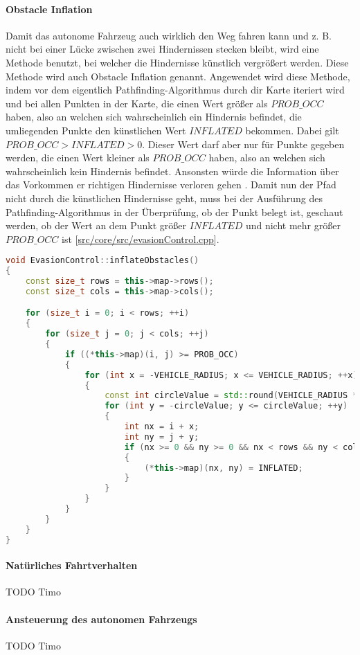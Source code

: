 \paragraph{Obstacle Inflation} \mbox{}

Damit das autonome Fahrzeug auch wirklich den Weg fahren kann und z. B. nicht bei einer Lücke zwischen zwei Hindernissen stecken bleibt, wird eine Methode benutzt, bei welcher die Hindernisse künstlich vergrößert werden. Diese Methode wird auch Obstacle Inflation genannt. Angewendet wird diese Methode, indem vor dem eigentlich Pathfinding-Algorithmus durch dir Karte iteriert wird und bei allen Punkten in der Karte, die einen Wert größer als \(PROB\_OCC\) haben, also an welchen sich wahrscheinlich ein Hindernis befindet, die umliegenden Punkte den künstlichen Wert \(INFLATED\) bekommen. Dabei gilt \(PROB\_OCC > INFLATED > 0\). Dieser Wert darf aber nur für Punkte gegeben werden, die einen Wert kleiner als \(PROB\_OCC\) haben, also an welchen sich wahrscheinlich kein Hindernis befindet. Ansonsten würde die Information über das Vorkommen er richtigen Hindernisse verloren gehen \cite{fernandesOrientationEnhancedAstar2015}. Damit nun der Pfad nicht durch die künstlichen Hindernisse geht, muss bei der Ausführung des Pathfinding-Algorithmus in der Überprüfung, ob der Punkt belegt ist, geschaut werden, ob der Wert an dem Punkt größer \(INFLATED\) und nicht mehr größer \(PROB\_OCC\) ist [\href{https://github.com/Jundy0/Studienarbeit/blob/main/src/core/src/evasionControl.cpp}{src/core/src/evasionControl.cpp}]. 

\begin{lstlisting}[caption={Obstacles Inflation},label={lst:inflateObstacles},language={C++}]
void EvasionControl::inflateObstacles()
{
    const size_t rows = this->map->rows();
    const size_t cols = this->map->cols();

    for (size_t i = 0; i < rows; ++i)
    {
        for (size_t j = 0; j < cols; ++j)
        {
            if ((*this->map)(i, j) >= PROB_OCC)
            {
                for (int x = -VEHICLE_RADIUS; x <= VEHICLE_RADIUS; ++x)
                {
                    const int circleValue = std::round(VEHICLE_RADIUS * std::cos(std::abs(x) * M_PI / (2 * VEHICLE_RADIUS)));
                    for (int y = -circleValue; y <= circleValue; ++y)
                    {
                        int nx = i + x;
                        int ny = j + y;
                        if (nx >= 0 && ny >= 0 && nx < rows && ny < cols && (*this->map)(nx, ny) < PROB_OCC)
                        {
                            (*this->map)(nx, ny) = INFLATED;
                        }
                    }
                }
            }
        }
    }
}
\end{lstlisting}

\paragraph{Natürliches Fahrtverhalten} \mbox{}

TODO Timo

\paragraph{Ansteuerung des autonomen Fahrzeugs} \mbox{}

TODO Timo

\newpage

